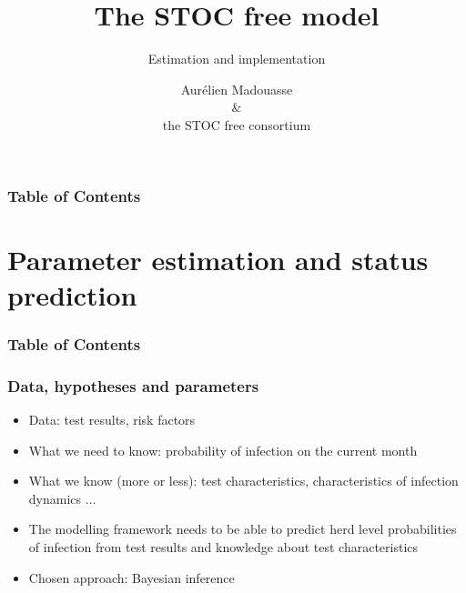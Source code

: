 \documentclass{beamer}
\title{The STOC free model}
\subtitle{Estimation and implementation}
\author[Madouasse \textit{et al.}]{Aurélien Madouasse \texorpdfstring{\\}{}\& \texorpdfstring{\\}{}the STOC free consortium}
\institute{\url{https://www.stocfree.eu/}}
\begin{document}
{
  \maketitle
}

\begin{frame}
\frametitle{Table of Contents}
  \tableofcontents
\end{frame}  

\section[Estimation \& prediction]{Parameter estimation and status prediction}
\begin{frame}
\frametitle{Table of Contents}
  \tableofcontents[currentsection]
\end{frame} 


\begin{frame}
\frametitle{Data, hypotheses and parameters}
\begin{itemize}
 \item{Data: test results, risk factors}
 \item{What we need to know: probability of infection on the current month}
 \item{What we know (more or less): test characteristics, characteristics of infection dynamics $\ldots$}
 \item{The modelling framework needs to be able to predict herd level probabilities of infection from test results and knowledge about test characteristics}
 \item{Chosen approach: Bayesian inference}
\end{itemize}
\end{frame}
\end{document}
